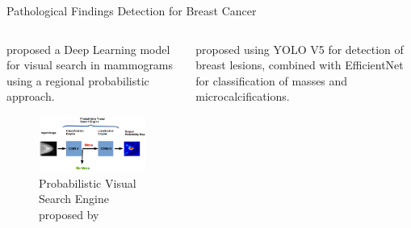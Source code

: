 \begin{frame}{Pathological Findings Detection for Breast Cancer}
    \begin{columns}
        \begin{column}{0.3\textwidth}
            \citeauthor{ertosunProbabilisticVisualSearch2015} proposed a Deep Learning model for visual search in mammograms using a regional probabilistic approach. 

            \begin{figure}
                \centering
                \includegraphics[width=\textwidth]{imagenes/ertosun_probmodel.png}
                \caption{Probabilistic Visual Search Engine proposed by \citeauthor{ertosunProbabilisticVisualSearch2015}}
            \end{figure}
        \end{column}
        \pause
        \begin{column}{0.3\textwidth}
            \citeauthor{frankDeepLearningArchitecture2023}
            proposed using YOLO V5 for detection of breast lesions, combined with EfficientNet for classification of masses and microcalcifications.


\end{column}
\end{columns}
\end{frame}
